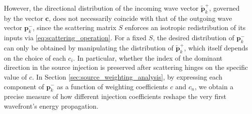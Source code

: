 \documentclass[journal]{IEEEtran}
\begin{document}
However, the directional distribution of the incoming wave vector $ \mathbf{\tilde p}_k^+$, governed by the vector $\mathbf{c}$, does not necessarily coincide with that of the outgoing wave vector $\mathbf{p}_k^-$, since the scattering matrix $S$ enforces an isotropic redistribution of its inputs via \eqref{eq:scattering_operation}. For a fixed 
$S$, the desired distribution of $\mathbf{p}_k^-$ can only be obtained by manipulating the distribution of $\mathbf{\tilde p}_{k}^{+}$, which itself depends on the choice of each $c_{i}$. In particular, whether the index of the dominant direction in the source injection is preserved after scattering hinges on the specific value of $c$. In Section \ref{sec:source_weighting_analysis}, by expressing each component of $\mathbf{p}_k^-$ as a function of weighting coefficients $c$ and $c_{n}$, we obtain a precise measure of how different injection coefficients reshape the very first wavefront’s energy propagation. 

\begin{table}[tb]
    \centering
   \caption{Analytical pressure and energy characteristics of the first‐order \emph{incoming} waves and their corresponding \emph{outgoing} waves as a function of the source-weighting parameter~$c$. The boldface column represents the original SDN.}

    \label{tab:c_properties}
    \renewcommand{\arraystretch}{1.3}
\end{table}
\end{document}
